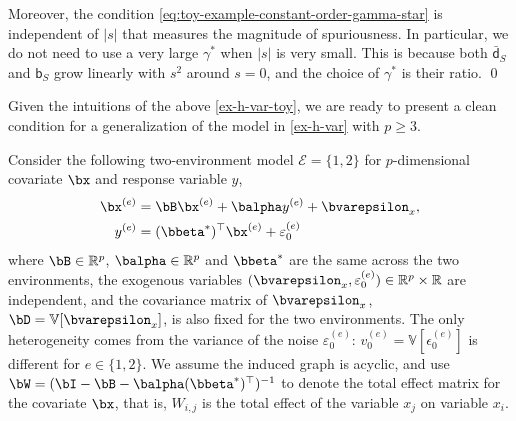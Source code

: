 \documentclass[10pt]{article}
\numberwithin{equation}{section}
\begin{document}
\begin{example}
{	Moreover, the condition \eqref{eq:toy-example-constant-order-gamma-star} is independent of $|s|$ that measures the magnitude of spuriousness. In particular, we do not need to use a very large $\gamma^*$ when $|s|$ is very small. This is because both $\bar{\mathsf{d}}_S$ and $\mathsf{b}_S$ grow linearly with $s^2$ around $s=0$, and the choice of $\gamma^*$ is their ratio.}
	\qed
\end{example}

Given the intuitions of the above \cref{ex-h-var-toy}, we are ready to present a clean condition for a generalization of the model in \cref{ex-h-var} with $p \ge 3$.

\begin{example}
\label{ex-h-var}
	Consider the following two-environment model	 $\mathcal{E}=\{1,2\}$ for $p$-dimensional covariate $\bx$ and response variable $y$,
	\begin{align}
	\label{eq:model-linear-scm-varying-v0}
	\begin{split}
		\bx^{(e)} &= \bB \bx^{(e)} + \balpha y^{(e)} + \bvarepsilon_x,\\
		y^{(e)} &= (\bbeta^*)^\top \bx^{(e)} + \varepsilon_0^{(e)}
	\end{split}
	\end{align} where $\bB\in \mathbb{R}^p$, $\balpha \in \mathbb{R}^p$ and $\bbeta^*$ are the same across the two environments, the exogenous variables $(\bvarepsilon_x, \varepsilon_0^{(e)}) \in \mathbb{R}^{p}\times \mathbb{R}$ are independent, and the covariance matrix of $\bvarepsilon_x$, $\bD = \mathbb{V}[\bvarepsilon_x]$, is also fixed for the two environments. The only heterogeneity comes from the variance of the noise $\varepsilon_0^{(e)}$: $v_0^{(e)}=\mathbb{V}[\epsilon_{0}^{(e)}]$ is different for $e\in \{1,2\}$. We assume the induced graph is acyclic, and use $\bW = (\bI - \bB - \balpha (\bbeta^*)^\top)^{-1}$ to denote the total effect matrix for the covariate $\bx$, that is, $W_{i,j}$ is the total effect of the variable $x_j$ on variable $x_i$.
\end{example}
\end{document}
